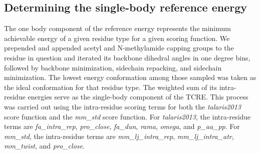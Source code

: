 \subsection{Determining the single-body reference energy}
The one body component of the reference energy represents the minimum achievable energy of a given residue type for a given scoring function.
We prepended and appended acetyl and N-methylamide capping groups to the residue in question and iterated its backbone dihedral angles in one degree bins, followed by backbone minimization, sidechain repacking, and sidechain minimization.
The lowest energy conformation among those sampled was taken as the ideal conformation for that residue type.
The weighted sum of its intra-residue energies serve as the single-body component of the TCRE.
This process was carried out using the intra-residue scoring terms for both the \textit{talaris2013} score function and the \textit{mm\_std} score function.
For \textit{talaris2013}, the intra-residue terms are \textit{fa\_intra\_rep}, \textit{pro\_close}, \textit{fa\_dun}, \textit{rama}, \textit{omega}, and \textit{p\_aa\_pp}.
For \textit{mm\_std}, the intra-residue terms are \textit{mm\_lj\_intra\_rep}, \textit{mm\_lj\_intra\_atr}, \textit{mm\_twist}, and \textit{pro\_close}.





